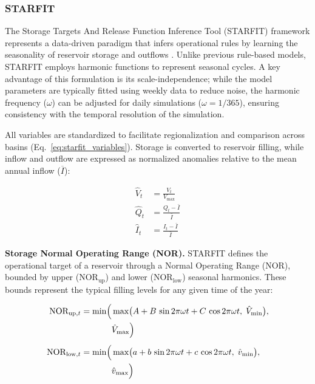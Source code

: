 \documentclass[hess, manuscript]{copernicus}
\begin{document}
\subsubsection{STARFIT}
\label{sec:starfit}

The Storage Targets And Release Function Inference Tool (STARFIT) framework represents a data-driven paradigm that infers operational rules by learning the seasonality of reservoir storage and outflows \citep{Turner2021}. Unlike previous rule-based models, STARFIT employs harmonic functions to represent seasonal cycles. A key advantage of this formulation is its scale-independence; while the model parameters are typically fitted using weekly data to reduce noise, the harmonic frequency ($\omega$) can be adjusted for daily simulations ($\omega=1/365$), ensuring consistency with the temporal resolution of the simulation.

All variables are standardized to facilitate regionalization and comparison across basins (Eq.~\ref{eq:starfit_variables}). Storage is converted to reservoir filling, while inflow and outflow are expressed as normalized anomalies relative to the mean annual inflow ($\overline{I}$): 

\begin{subequations}
\label{eq:starfit_variables}
    \begin{align}
        \hat{V}_{t} &= \frac{V_t}{V_{\max}} \label{eq:standard_volume} \\
        \hat{Q}_{t} &= \frac{Q_t - \bar{I}}{\bar{I}} \label{eq:standard_outflow} \\
        \hat{I}_{t} &= \frac{I_t - \bar{I}}{\bar{I}} \label{eq:standard_inflow}
    \end{align}
\end{subequations}

\medskip
\textbf{Storage Normal Operating Range (NOR).} STARFIT defines the operational target of a reservoir through a Normal Operating Range (NOR), bounded by upper ($\text{NOR}_{\text{up}}$) and lower ($\text{NOR}_{\text{low}}$) seasonal harmonics. These bounds represent the typical filling levels for any given time of the year:

{\small
\begin{equation}
\label{eq:starfit_nor}
    \begin{alignedat}{2}
        \text{NOR}_{\text{up},t}   &= \min \Bigl( && \max \bigl( A + B \, \sin 2\pi\omega t + C \, \cos 2\pi\omega t, \; \hat{V}_{\min} \bigr), \\
                                   &              && \hat{V}_{\max} \Bigr) \\[1ex]
        \text{NOR}_{\text{low},t}  &= \min \Bigl( && \max \bigl( a + b \, \sin 2\pi\omega t + c \, \cos 2\pi\omega t, \; \hat{v}_{\min} \bigr), \\
                                   &              && \hat{v}_{\max} \Bigr) 
    \end{alignedat}
\end{equation}
}
\end{document}
